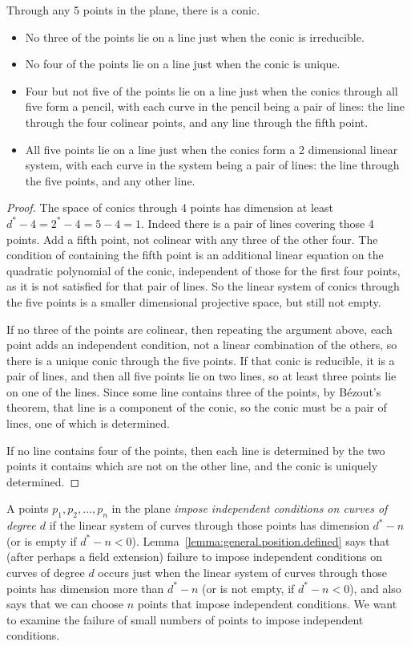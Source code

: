 \begin{lemma}\label{lemma:conics.5.points}
Through any 5 points in the plane, there is a conic.
\begin{itemize}
\item
No three of the points lie on a line just when the conic is irreducible.
\item
No four of the points lie on a line just when the conic is unique.
\item
Four but not five of the points lie on a line just when the conics through all five form a pencil, with each curve in the pencil being a pair of lines: the line through the four colinear points, and any line through the fifth point.
\item
All five points lie on a line just when the conics form a 2 dimensional linear system, with each curve in the system being a pair of lines: the line through the five points, and any other line.
\end{itemize}
\end{lemma}
\begin{proof}
The space of conics through 4 points has dimension at least \(d^*-4=2^*-4=5-4=1\).
Indeed there is a pair of lines covering those 4 points.
Add a fifth point, not colinear with any three of the other four.
The condition of containing the fifth point is an additional linear equation on the quadratic polynomial of the conic, independent of those for the first four points, as it is not satisfied for that pair of lines.
So the linear system of conics through the five points is a smaller dimensional projective space, but still not empty.

If no three of the points are colinear, then repeating the argument above, each point adds an independent condition, not a linear combination of the others, so there is a unique conic through the five points.
If that conic is reducible, it is a pair of lines, and then all five points lie on two lines, so at least three points lie on one of the lines.
Since some line contains three of the points, by B\'ezout's theorem, that line is a component of the conic, so the conic must be a pair of lines, one of which is determined.

If no line contains four of the points, then each line is determined by the two points it contains which are not on the other line, and the conic is uniquely determined.
\end{proof}


A points \(p_1,p_2,\dots,p_n\) in the plane \emph{impose independent conditions on curves of degree \(d\)} if the linear system of curves through those points has dimension \(d^*-n\) (or is empty if \(d^*-n<0\)).
Lemma~\vref{lemma:general.position.defined} says that (after perhaps a field extension) failure to impose independent conditions on curves of degree \(d\) occurs just when the linear system of curves through those points has dimension more than \(d^*-n\) (or is not empty, if \(d^*-n<0\)), and also says that we can choose \(n\) points that impose independent conditions.
We want to examine the failure of small numbers of points to impose independent conditions.

